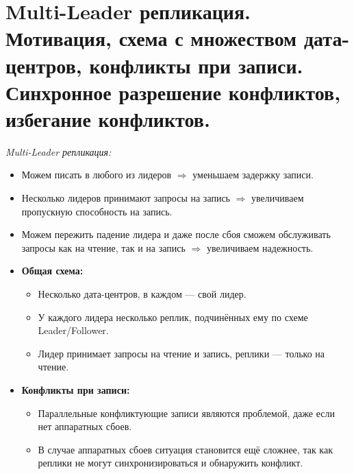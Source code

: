\section{Multi-Leader репликация. Мотивация, схема с множеством дата-центров, конфликты при записи. Синхронное разрешение конфликтов, избегание конфликтов.}

\begin{definition}
    \textit{Multi-Leader репликация:}
    \begin{itemize}
        \item Можем писать в любого из лидеров $\Rightarrow$ уменьшаем задержку записи.
        \item Несколько лидеров принимают запросы на запись $\Rightarrow$ увеличиваем пропускную способность на запись.
        \item Можем пережить падение лидера и даже после сбоя сможем обслуживать запросы как на чтение, так и на запись $\Rightarrow$ увеличиваем надежность.

        \item \textbf{Общая схема:}
        \begin{itemize}
            \item Несколько дата-центров, в каждом --- свой лидер.
            \item У каждого лидера несколько реплик, подчинённых ему по схеме Leader/Follower.
            \item Лидер принимает запросы на чтение и запись, реплики --- только на чтение.
        \end{itemize}

        \item \textbf{Конфликты при записи:}
        \begin{itemize}
            \item Параллельные конфликтующие записи являются проблемой, даже если нет аппаратных сбоев.
            \item В случае аппаратных сбоев ситуация становится ещё сложнее, так как реплики не могут синхронизироваться и обнаружить конфликт.
        \end{itemize}
    \end{itemize}

\end{definition}

